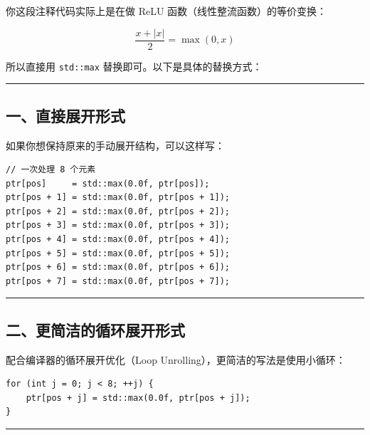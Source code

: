 \documentclass[11pt, a4paper]{article}
\begin{document}
\begin{aibox}
你这段注释代码实际上是在做 ReLU 函数（线性整流函数）的等价变换：

\[
\frac{x + |x|}{2} = \max(0, x)
\]

所以直接用 \texttt{std::max} 替换即可。以下是具体的替换方式：

\begin{center}\rule{\textwidth}{0.4pt}\end{center}

\subsection*{一、直接展开形式}

如果你想保持原来的手动展开结构，可以这样写：

\begin{tcolorbox}[colback=white,colframe=gray!50!white,boxrule=0.5pt,arc=2pt,left=5pt,right=5pt,top=5pt,bottom=5pt]
\begin{verbatim}
// 一次处理 8 个元素
ptr[pos]     = std::max(0.0f, ptr[pos]);
ptr[pos + 1] = std::max(0.0f, ptr[pos + 1]);
ptr[pos + 2] = std::max(0.0f, ptr[pos + 2]);
ptr[pos + 3] = std::max(0.0f, ptr[pos + 3]);
ptr[pos + 4] = std::max(0.0f, ptr[pos + 4]);
ptr[pos + 5] = std::max(0.0f, ptr[pos + 5]);
ptr[pos + 6] = std::max(0.0f, ptr[pos + 6]);
ptr[pos + 7] = std::max(0.0f, ptr[pos + 7]);
\end{verbatim}
\end{tcolorbox}

\begin{center}\rule{\textwidth}{0.4pt}\end{center}

\subsection*{二、更简洁的循环展开形式}

配合编译器的循环展开优化（Loop Unrolling），更简洁的写法是使用小循环：

\begin{tcolorbox}[colback=white,colframe=gray!50!white,boxrule=0.5pt,arc=2pt,left=5pt,right=5pt,top=5pt,bottom=5pt]
\begin{verbatim}
for (int j = 0; j < 8; ++j) {
    ptr[pos + j] = std::max(0.0f, ptr[pos + j]);
}
\end{verbatim}
\end{tcolorbox}

\begin{center}\rule{\textwidth}{0.4pt}\end{center}


\end{aibox}
\end{document}
